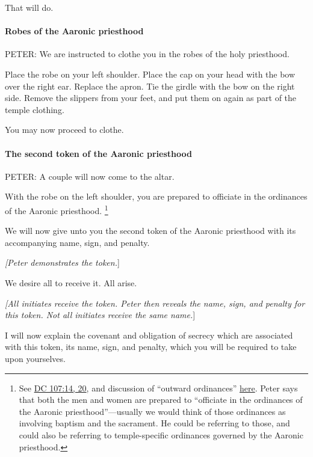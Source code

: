 				That will do.
				
			\paragraph{Robes of the Aaronic priesthood}
				\label{TEMPLE-ENDOWMENT-ENDOW-PRE-1990-ROBES-AARONIC}

				PETER: We are instructed to clothe you in the robes of the holy priesthood.

				Place the robe on your left shoulder. Place the cap on your head with the bow over the right ear. Replace the apron. Tie the girdle with the bow on the right side. Remove the slippers from your feet, and put them on again as part of the temple clothing.

				You may now proceed to clothe.
				
			\paragraph{The second token of the Aaronic priesthood}
				\label{TEMPLE-ENDOWMENT-ENDOW-PRE-1990-SECOND-AARONIC}
				
				PETER: A couple will now come to the altar.

				With the robe on the left shoulder, you are prepared to officiate in the ordinances of the Aaronic priesthood.%
					\footnote{%
						\label{ENDOWMENT-officiate-aaronic}%
						See \hyperref[DC107-14]{DC 107:14, 20}, and discussion of ``outward ordinances'' \hyperref[ORDINANCE-PHRASES]{here}. Peter says that both the men and women are prepared to ``officiate in the ordinances of the Aaronic priesthood''---usually we would think of those ordinances as involving baptism and the sacrament. He could be referring to those, and could also be referring to temple-specific ordinances governed by the Aaronic priesthood.
						}

				We will now give unto you the second token of the Aaronic priesthood with its accompanying name, sign, and penalty.

				\textit{[Peter demonstrates the token.}]

				We desire all to receive it. All arise.

				\textit{[All initiates receive the token. Peter then reveals the name, sign, and penalty for this token. Not all initiates receive the same name.}]

				I will now explain the covenant and obligation of secrecy which are associated with this token, its name, sign, and penalty, which you will be required to take upon yourselves.


